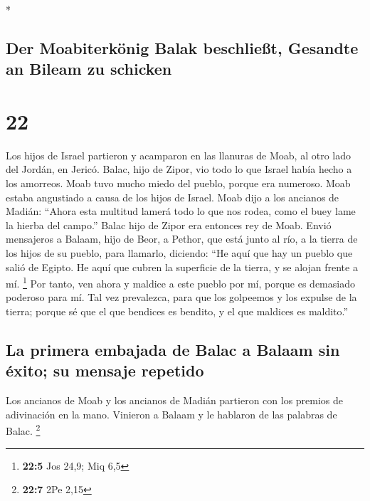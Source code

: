 \begin{paracol}{2}
\begin{otherlanguage}{english}
\end{otherlanguage}

\switchcolumn[0]*

\hypertarget{der-moabiterkuxf6nig-balak-beschlieuxdft-gesandte-an-bileam-zu-schicken}{%
\subsection{Der Moabiterkönig Balak beschließt, Gesandte an Bileam zu
schicken}\label{der-moabiterkuxf6nig-balak-beschlieuxdft-gesandte-an-bileam-zu-schicken}}

\hypertarget{section-42}{%
\section{22}\label{section-42}}

 Los hijos de Israel partieron y acamparon en las llanuras
de Moab, al otro lado del Jordán, en Jericó.  Balac, hijo
de Zipor, vio todo lo que Israel había hecho a los amorreos.
 Moab tuvo mucho miedo del pueblo, porque era numeroso.
Moab estaba angustiado a causa de los hijos de Israel. 
Moab dijo a los ancianos de Madián: ``Ahora esta multitud lamerá todo lo
que nos rodea, como el buey lame la hierba del campo.'' Balac hijo de
Zipor era entonces rey de Moab.  Envió mensajeros a
Balaam, hijo de Beor, a Pethor, que está junto al río, a la tierra de
los hijos de su pueblo, para llamarlo, diciendo: ``He aquí que hay un
pueblo que salió de Egipto. He aquí que cubren la superficie de la
tierra, y se alojan frente a mí. \footnote{\textbf{22:5} Jos 24,9; Miq
  6,5}  Por tanto, ven ahora y maldice a este pueblo por
mí, porque es demasiado poderoso para mí. Tal vez prevalezca, para que
los golpeemos y los expulse de la tierra; porque sé que el que bendices
es bendito, y el que maldices es maldito.''

\hypertarget{la-primera-embajada-de-balac-a-balaam-sin-uxe9xito-su-mensaje-repetido}{%
\subsection{La primera embajada de Balac a Balaam sin éxito; su mensaje
repetido}\label{la-primera-embajada-de-balac-a-balaam-sin-uxe9xito-su-mensaje-repetido}}

 Los ancianos de Moab y los ancianos de Madián partieron
con los premios de adivinación en la mano. Vinieron a Balaam y le
hablaron de las palabras de Balac. \footnote{\textbf{22:7} 2Pe 2,15}


\end{paracol}
